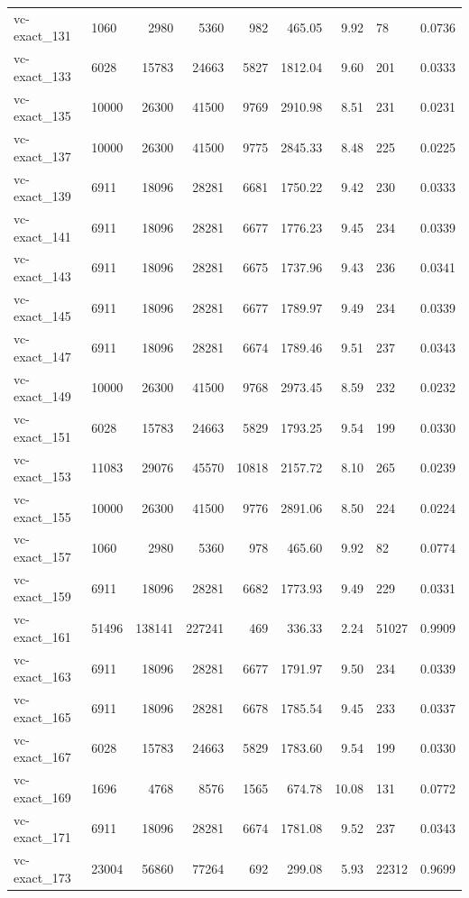 \begin{longtable}{llrrrrrll}
vc-exact\_131 & 1060 & 2980 & 5360 & 982 & 465.05 & 9.92 & 78 & 0.0736 \\
vc-exact\_133 & 6028 & 15783 & 24663 & 5827 & 1812.04 & 9.60 & 201 & 0.0333 \\
vc-exact\_135 & 10000 & 26300 & 41500 & 9769 & 2910.98 & 8.51 & 231 & 0.0231 \\
vc-exact\_137 & 10000 & 26300 & 41500 & 9775 & 2845.33 & 8.48 & 225 & 0.0225 \\
vc-exact\_139 & 6911 & 18096 & 28281 & 6681 & 1750.22 & 9.42 & 230 & 0.0333 \\
vc-exact\_141 & 6911 & 18096 & 28281 & 6677 & 1776.23 & 9.45 & 234 & 0.0339 \\
vc-exact\_143 & 6911 & 18096 & 28281 & 6675 & 1737.96 & 9.43 & 236 & 0.0341 \\
vc-exact\_145 & 6911 & 18096 & 28281 & 6677 & 1789.97 & 9.49 & 234 & 0.0339 \\
vc-exact\_147 & 6911 & 18096 & 28281 & 6674 & 1789.46 & 9.51 & 237 & 0.0343 \\
vc-exact\_149 & 10000 & 26300 & 41500 & 9768 & 2973.45 & 8.59 & 232 & 0.0232 \\
vc-exact\_151 & 6028 & 15783 & 24663 & 5829 & 1793.25 & 9.54 & 199 & 0.0330 \\
vc-exact\_153 & 11083 & 29076 & 45570 & 10818 & 2157.72 & 8.10 & 265 & 0.0239 \\
vc-exact\_155 & 10000 & 26300 & 41500 & 9776 & 2891.06 & 8.50 & 224 & 0.0224 \\
vc-exact\_157 & 1060 & 2980 & 5360 & 978 & 465.60 & 9.92 & 82 & 0.0774 \\
vc-exact\_159 & 6911 & 18096 & 28281 & 6682 & 1773.93 & 9.49 & 229 & 0.0331 \\
vc-exact\_161 & 51496 & 138141 & 227241 & 469 & 336.33 & 2.24 & 51027 & 0.9909 \\
vc-exact\_163 & 6911 & 18096 & 28281 & 6677 & 1791.97 & 9.50 & 234 & 0.0339 \\
vc-exact\_165 & 6911 & 18096 & 28281 & 6678 & 1785.54 & 9.45 & 233 & 0.0337 \\
vc-exact\_167 & 6028 & 15783 & 24663 & 5829 & 1783.60 & 9.54 & 199 & 0.0330 \\
vc-exact\_169 & 1696 & 4768 & 8576 & 1565 & 674.78 & 10.08 & 131 & 0.0772 \\
vc-exact\_171 & 6911 & 18096 & 28281 & 6674 & 1781.08 & 9.52 & 237 & 0.0343 \\
vc-exact\_173 & 23004 & 56860 & 77264 & 692 & 299.08 & 5.93 & 22312 & 0.9699 \\

\end{longtable}
